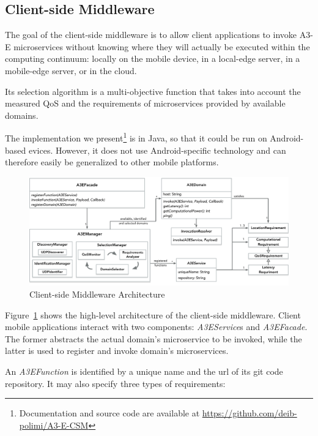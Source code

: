 \subsection{Client-side Middleware}


The goal of the client-side middleware is to allow client applications to invoke A3-E microservices without knowing where they will actually be executed within the computing continuum: locally on the mobile device, in a local-edge server, in a mobile-edge server, or in the cloud. 

Its selection algorithm is a multi-objective function that takes into account the measured QoS and the requirements of microservices provided by available domains.

The implementation we present\footnote{Documentation and source code are available at \url{https://github.com/deib-polimi/A3-E-CSM}} is in Java, so that it could be run on Android-based evices. However, it does not use Android-specific technology and can therefore easily be generalized to other mobile platforms. 

\begin{figure}[tbp]
	\includegraphics[width=1\textwidth]{figs/a3e-mobile-prototype}
	\caption{Client-side Middleware Architecture}
	\label{fig:mobile-prototype}
\end{figure}

Figure~\ref{fig:mobile-prototype} shows the high-level architecture of the client-side middleware. Client mobile applications interact with two components: \textit{A3EService}s and \textit{A3EFacade}. The former abstracts the actual domain's microservice to be invoked, while the latter is used to register and invoke domain's microservices. 

An \textit{A3EFunction} is identified by a unique name and the url of its git code repository. It may also specify three types of requirements: 

